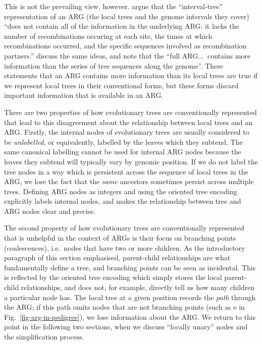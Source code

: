 \documentclass{article}
\newcommand{\noderef}[1]{\textsf{#1}}
\begin{document}
This is not the prevailing view, however.
\cite{kuhner2017consensus} argue that the
``interval-tree'' representation of
an ARG (the local trees and the genome intervals they cover)
``does not contain all of the information in the underlying ARG: it lacks the
number of recombinations occuring at each site, the times at which
recombinations occurred, and the specific sequences involved as recombination
partners.''
\cite{shipilina2023origin} discuss the same ideas,
and note that the
``full ARG...~contains more information than the series of tree
sequences along the genome''.
These
%
statements that an ARG
contains more information than its local trees are true
if we represent local trees in their conventional forms,
but these forms discard important information that is
available in an ARG.

There are two properties of how evolutionary trees are conventionally
represented that lead to this
disagreement about the relationship between local trees and an ARG.
Firstly, the internal nodes of evolutionary trees are usually considered to be
\emph{unlabelled}, or equivalently, labelled by the leaves which they subtend.
The same canonical labelling cannot be used for internal ARG nodes because the
leaves they subtend will typically vary by genomic position. If we do not label
the tree nodes in a way which is persistent across the sequence of local trees
in the ARG, we lose the fact that the \emph{same} ancestors sometimes persist
across multiple trees.
Defining ARG nodes as integers and using the oriented
tree encoding explicitly labels internal nodes, and makes the relationship
between tree and ARG nodes clear and precise.

The second property of how evolutionary trees
are conventionally represented that is unhelpful in the context of ARGs is their
focus on branching points (coalescences), i.e.\ nodes that have two or more children.
As the introductory paragraph of this section emphasised,
parent-child relationships are what fundamentally define a tree,
and branching points can be seen as incidental. This is reflected
by the oriented tree encoding which simply stores the local
parent-child relationships, and does not, for example,
directly tell us how many children a particular node has.
The local tree at a given position records the \emph{path} through
the ARG; if this path omits nodes that are not
branching points (such as \noderef{e} in Fig.~\ref{fig-arg-in-pedigree}),
we lose information about the ARG.
We return to this point in the following two sections,
when we discuss ``locally unary'' nodes and the simplification process.
\end{document}

